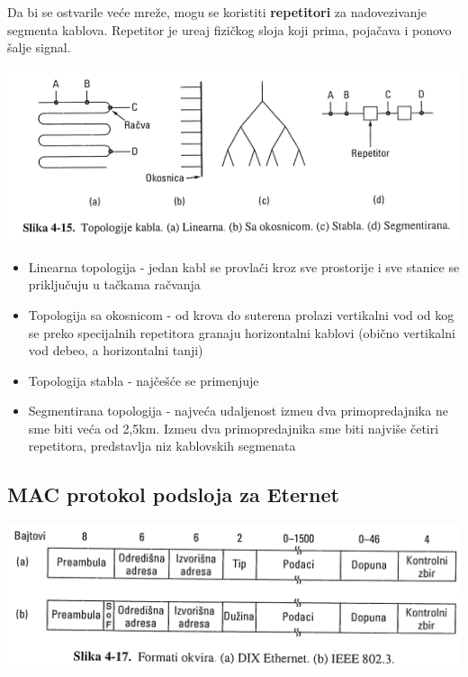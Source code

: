 \documentclass{article} %
\begin{document}
Da bi se ostvarile ve\'{c}e mre\v{z}e, mogu se koristiti \textbf{repetitori} za nadovezivanje segmenta kablova. Repetitor je ure\dj{}aj fizi\v{c}kog sloja koji prima, poja\v{c}ava i ponovo \v{s}alje signal.

\begin{center}
\includegraphics[scale=0.5]{ethernet-topologije}
\end{center}

\begin{itemize}
	\item Linearna topologija - jedan kabl se provla\v{c}i kroz sve prostorije i sve stanice se priklju\v{c}uju u ta\v{c}kama ra\v{c}vanja
	\item Topologija sa okosnicom - od krova do suterena prolazi vertikalni vod od kog se preko specijalnih repetitora granaju horizontalni kablovi (obi\v{c}no vertikalni vod debeo, a horizontalni tanji)
	\item Topologija stabla - naj\v{c}e\v{s}\'{c}e se primenjuje
	\item Segmentirana topologija - najve\'{c}a udaljenost izme\dj{}u dva primopredajnika ne sme biti ve\'{c}a od 2,5km. Izme\dj{}u dva primopredajnika sme biti najvi\v{s}e \v{c}etiri repetitora, predstavlja niz kablovskih segmenata
\end{itemize}

\subsection{MAC protokol podsloja za Eternet}

\begin{center}
\includegraphics[scale=0.5]{format-okvira}
\end{center}
\end{document}
